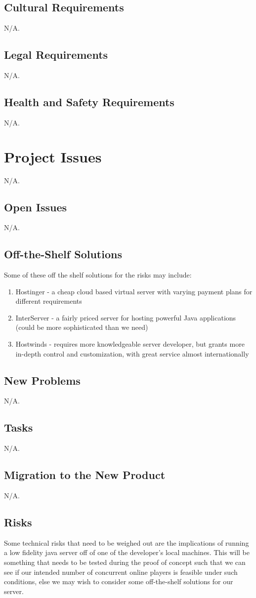 \documentclass[12pt, titlepage]{article}
\begin{document}
\subsection{Cultural Requirements}
N/A.
\subsection{Legal Requirements}
N/A.
\subsection{Health and Safety Requirements}
N/A.
\section{Project Issues}
N/A.
\subsection{Open Issues}
N/A.
\subsection{Off-the-Shelf Solutions}
Some of these off the shelf solutions for the risks may include:

\begin{enumerate}
    \item Hostinger - a cheap cloud based virtual server with varying payment plans for different requirements
    \item InterServer - a fairly priced server for hosting powerful Java applications (could be more sophisticated than we need) 
    \item Hostwinds - requires more knowledgeable server developer, but grants more in-depth control and customization, with great service almost internationally
\end{enumerate}

\subsection{New Problems}
N/A.
\subsection{Tasks}
N/A.
\subsection{Migration to the New Product}
N/A.
\subsection{Risks}
Some technical risks that need to be weighed out are the implications of running a low fidelity java server off of one of the developer's local machines. This will be something that needs to be tested during the proof of concept such that we can see if our intended number of concurrent online players is feasible under such conditions, else we may wish to consider some off-the-shelf solutions for our server. 
\end{document}
